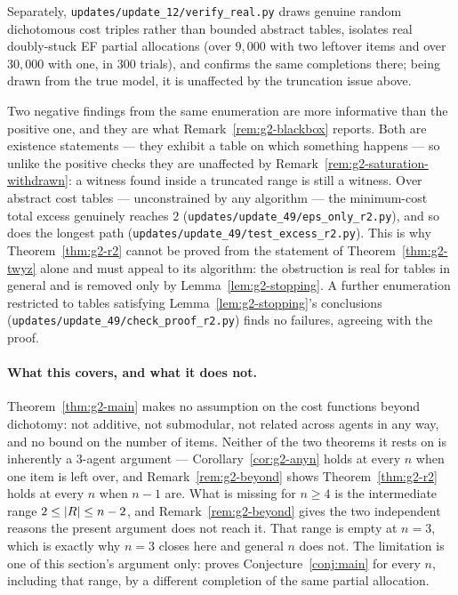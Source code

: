Separately, \texttt{updates/update\_12/verify\_real.py} draws genuine random
dichotomous cost triples rather than bounded abstract tables, isolates real
doubly-stuck EF partial allocations (over $9{,}000$ with two leftover items
and over $30{,}000$ with one, in $300$ trials), and confirms the same
completions there; being drawn from the true model, it is unaffected by the
truncation issue above.

Two negative findings from the same enumeration are more informative than
the positive one, and they are what Remark~\ref{rem:g2-blackbox} reports.
Both are existence statements --- they exhibit a table on which something
happens --- so unlike the positive checks they are unaffected by
Remark~\ref{rem:g2-saturation-withdrawn}: a witness found inside a truncated
range is still a witness. Over abstract cost tables ---
unconstrained by any algorithm --- the minimum-cost
total excess genuinely reaches $2$
(\texttt{updates/update\_49/eps\_only\_r2.py}), and so does the longest path
(\texttt{updates/update\_49/test\_excess\_r2.py}). This is why Theorem~\ref{thm:g2-r2}
cannot be proved from the statement of Theorem~\ref{thm:g2-twyz} alone and must
appeal to its algorithm: the obstruction is real for tables in general and
is removed only by Lemma~\ref{lem:g2-stopping}. A further enumeration restricted
to tables satisfying Lemma~\ref{lem:g2-stopping}'s conclusions
(\texttt{updates/update\_49/check\_proof\_r2.py}) finds no failures, agreeing with
the proof.

\paragraph{What this covers, and what it does not.} Theorem~\ref{thm:g2-main} makes
no assumption on the cost functions beyond dichotomy: not additive, not
submodular, not related across agents in any way, and no bound on the number
of items. Neither of the two theorems it rests on is inherently a $3$-agent
argument --- Corollary~\ref{cor:g2-anyn} holds at every $n$ when one item is left
over, and Remark~\ref{rem:g2-beyond} shows Theorem~\ref{thm:g2-r2} holds at every $n$
when $n-1$ are. What is missing for $n \ge 4$ is the intermediate range
$2 \le \left\lvert R\right\rvert \le n-2$, and Remark~\ref{rem:g2-beyond} gives the two independent
reasons the present argument does not reach it. That range is empty at
$n = 3$, which is exactly why $n = 3$ closes here and general $n$ does not.
The limitation is one of this section's argument only:
 proves Conjecture~\ref{conj:main} for every $n$,
including that range, by a different completion of the same partial
allocation.
